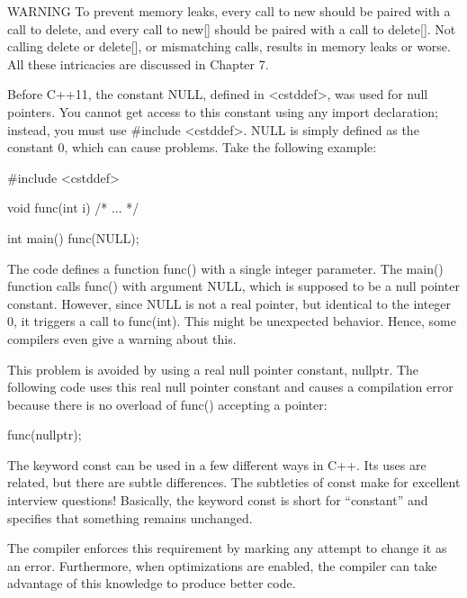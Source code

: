 \begin{myWarning}{WARNING}
To prevent memory leaks, every call to new should be paired with a call to delete, and every call to new[] should be paired with a call to delete[]. Not calling delete or delete[], or mismatching calls, results in memory leaks or worse. All these intricacies are discussed in Chapter 7.
\end{myWarning}


Before C++11, the constant NULL, defined in <cstddef>, was used for null pointers. You cannot get access to this constant using any import declaration; instead, you must use \#include <cstddef>. NULL is simply defined as the constant 0, which can cause problems. Take the following example:

\begin{cpp}
#include <cstddef>

void func(int i) { /* ... */ }

int main()
{
    func(NULL);
}
\end{cpp}

The code defines a function func() with a single integer parameter. The main() function calls func() with argument NULL, which is supposed to be a null pointer constant. However, since NULL is not a real pointer, but identical to the integer 0, it triggers a call to func(int). This might be unexpected behavior. Hence, some compilers even give a warning about this.

This problem is avoided by using a real null pointer constant, nullptr. The following code uses this real null pointer constant and causes a compilation error because there is no overload of func() accepting a pointer:

\begin{cpp}
func(nullptr);
\end{cpp}


The keyword const can be used in a few different ways in C++. Its uses are related, but there are subtle differences. The subtleties of const make for excellent interview questions! Basically, the keyword const is short for “constant” and specifies that something remains unchanged.

The compiler enforces this requirement by marking any attempt to change it as an error. Furthermore, when optimizations are enabled, the compiler can take advantage of this knowledge to produce better code.


